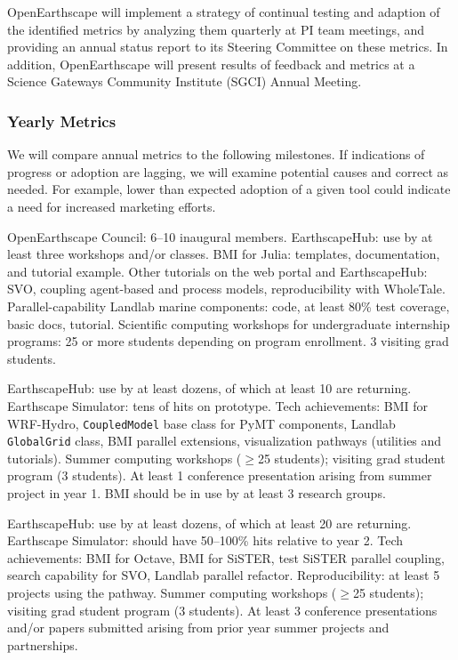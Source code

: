 OpenEarthscape will implement a strategy of continual testing and adaption of the identified metrics by analyzing them quarterly at PI team meetings, and providing an annual status report to its Steering Committee on these metrics. %
In addition,  OpenEarthscape will present results of feedback and metrics at a Science Gateways Community Institute (SGCI) Annual Meeting.  


\subsubsection*{Yearly Metrics}

We will compare annual metrics to the following milestones. If indications of progress or adoption are lagging, we will examine potential causes and correct as needed. For example, lower than expected adoption of a given tool could indicate a need for increased marketing efforts.

 OpenEarthscape Council: 6--10 inaugural members. EarthscapeHub: use by at least three workshops and/or classes. BMI for Julia: templates, documentation, and tutorial example. Other tutorials on the web portal and EarthscapeHub: SVO, coupling agent-based and process models, reproducibility with WholeTale. Parallel-capability Landlab marine components: code, at least 80\% test coverage, basic docs, tutorial. Scientific computing workshops for undergraduate internship programs: 25 or more students depending on program enrollment. 3 visiting grad students.

 EarthscapeHub: use by at least dozens, of which at least 10 are returning. Earthscape Simulator: tens of hits on prototype. Tech achievements: BMI for WRF-Hydro, \texttt{CoupledModel} base class for PyMT components, Landlab \texttt{GlobalGrid} class, BMI parallel extensions, visualization pathways (utilities and  tutorials). Summer  computing workshops ($\ge$25 students); visiting grad student program (3 students). At least 1 conference presentation arising from summer project in year 1. BMI should be in use by at least 3 research groups.

 EarthscapeHub: use by at least dozens, of which at least 20 are returning. Earthscape Simulator: should have 50--100\% hits relative to year 2. Tech achievements: BMI for Octave, BMI for SiSTER, test SiSTER parallel coupling, search capability for SVO, Landlab parallel refactor. Reproducibility: at least 5 projects using the pathway. Summer  computing workshops ($\ge$25 students); visiting grad student program (3 students). At least 3 conference presentations and/or papers submitted arising from prior year summer projects and partnerships.

